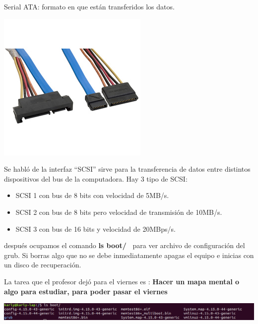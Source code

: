 \documentclass[a4paper, 11pt, oneside]{article}
\begin{document}
Serial ATA: formato en que están transferidos los datos.
\begin{center}
 \includegraphics[scale=0.30]{31102.jpg}
\end{center}

Se habló de la interfaz ``SCSI'' sirve para la transferencia de datos entre distintos dispositivos del bus de la computadora. Hay 3 tipo de SCSI:
\begin{itemize}
 \item SCSI 1 con bus de 8 bits con velocidad de 5MB/s.
 \item SCSI 2 con bus de 8 bits pero velocidad de transmisión de 10MB/s.
 \item SCSI 3 con bus de 16 bits y velocidad de 20MBps/s.
\end{itemize}

\newpage
después ocupamos el comando \textbf{ls boot/\ } para ver archivo de configuración del grub. Si borras algo que no se debe inmediatamente apagas el equipo e inicias con un disco de recuperación.

La tarea que el profesor dejó para el viernes es :
\textbf{Hacer un mapa mental o algo para estudiar, para poder pasar el viernes}
\begin{center}
 \includegraphics[scale=0.30]{41102}
\end{center}
\end{document}
